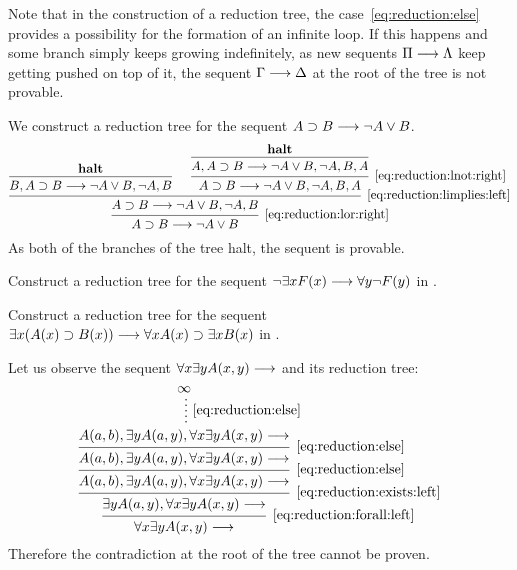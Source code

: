 \documentclass[11pt,a4paper]{article}
\begin{document}
Note that in the construction of a reduction tree,
the case~\eqref{eq:reduction:else} provides a possibility
for the formation of an infinite loop. If this happens and
some branch simply keeps growing indefinitely,
as new sequents \(\Pi\longrightarrow\Lambda\) keep getting pushed on top of it,
the sequent \(\Gamma\longrightarrow\Delta\) at the root of the tree
is not provable.

\begin{example}\label{exa:reduction tree}
    We construct a reduction tree for the sequent
    \(A\supset B\longrightarrow\lnot A\lor B\).
    \begin{equation*}
        \begin{prooftree}
            \hypo{\halt}
            \infer1{B, A\limplies B\seq\lnot A\lor B, \lnot A, B}
            \hypo{\halt}
            \infer1{A, A\limplies B\seq\lnot A\lor B, \lnot A, B, A}
            \infer1[\eqref{eq:reduction:lnot:right}]{A\limplies B\seq\lnot A\lor B, \lnot A, B, A}
            \infer2[\eqref{eq:reduction:limplies:left}]{A\limplies B\seq\lnot A\lor B, \lnot A, B}
            \infer1[\eqref{eq:reduction:lor:right}]{A\limplies B\seq\lnot A\lor B}
        \end{prooftree}
    \end{equation*}
    As both of the branches of the tree halt,
    the sequent is provable.
\end{example}

\begin{exercise}[8.3.1]\label{exe:8.3.1}
    Construct a reduction tree for the sequent
    \(\lnot\exists xF(x)\longrightarrow \forall y\lnot F(y)\) in \LK{}.
\end{exercise}

\begin{exercise}[8.3.2]\label{exe:8.3.2}
    Construct a reduction tree for the sequent
    \(\exists x(A(x)\supset B(x))\longrightarrow \forall xA(x)\supset\exists xB(x)\) in \LK{}.
\end{exercise}

\begin{example}\label{exa:infinite reduction tree}
    Let us observe the sequent \(\forall x\exists yA(x,y)\longrightarrow\) and its reduction tree:
\begin{equation*}
    \begin{prooftree}
        \hypo{\infty}
        \ellipsis{\eqref{eq:reduction:else}}{A(a,b),\exists yA(a,y),\forall x\exists yA(x,y)\seq}
        \infer1[\eqref{eq:reduction:else}]{A(a,b),\exists yA(a,y),\forall x\exists yA(x,y)\seq}
        \infer1[\eqref{eq:reduction:else}]{A(a,b),\exists yA(a,y),\forall x\exists yA(x,y)\seq}
        \infer1[\eqref{eq:reduction:exists:left}]{\exists yA(a,y), \forall x\exists yA(x,y)\seq}
        \infer1[\eqref{eq:reduction:forall:left}]{\forall x\exists yA(x,y)\seq}
    \end{prooftree}
\end{equation*}
Therefore the contradiction at the root of the tree cannot be proven.
\end{example}
\end{document}
